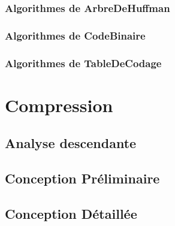 \documentclass[10pt]{report}
\begin{document}
            \subsection{Algorithmes de ArbreDeHuffman}
                
            \subsection{Algorithmes de CodeBinaire}
                
            \subsection{Algorithmes de TableDeCodage}
                

    \chapter{Compression}

        \section{Analyse descendante}

        \newpage
        \section{Conception Préliminaire}
            
            
            
            
            
			
            
            

        \newpage
        \section{Conception Détaillée}
            
            
            
            
          	
			
            
            
    
\end{document}
